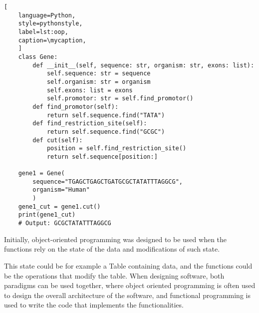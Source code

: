 \def\mycaption{ Example of a class in python. The class is called
    \texttt{Person} and has two functions, ``\texttt{\_\_init\_\_}'' and
    ``\texttt{say\_hello}''. The function ``\texttt{\_\_init\_\_}'' is
    called when creating (``initializing'') an object and fills the object
    with data. The parameter ``\texttt{self}'' is used to reference the
    object itself internally. The function ``\texttt{say\_hello}'' is a
    method that prints the string ``Hello!'' when called. The method
    ``\texttt{introduce}'' is a method that calls the method
    ``\texttt{say\_hello}'' and comines the string ``I am'' with the name of
    the object. }
\begin{lstlisting}[
    language=Python,
    style=pythonstyle,
    label=lst:oop,
    caption=\mycaption,
    ]
    class Gene:
        def __init__(self, sequence: str, organism: str, exons: list):
            self.sequence: str = sequence
            self.organism: str = organism
            self.exons: list = exons
            self.promotor: str = self.find_promotor()
        def find_promotor(self):
            return self.sequence.find("TATA")
        def find_restriction_site(self):
            return self.sequence.find("GCGC")
        def cut(self):
            position = self.find_restriction_site()
            return self.sequence[position:]
            
    gene1 = Gene(
        sequence="TGAGCTGAGCTGATGCGCTATATTTAGGCG", 
        organism="Human"
        )
    gene1_cut = gene1.cut()
    print(gene1_cut)
    # Output: GCGCTATATTTAGGCG
\end{lstlisting}



Initially, object-oriented programming was designed to
be used when the functions rely on the state of the data and
modifications of such state.

This state could be for example a Table
containing data, and the functions could be the operations that modify
the table. When designing software, both paradigms can be used together, where
object oriented programming is often used to design the overall
architecture of the software, and functional programming is used to
write the code that implements the functionalities.




